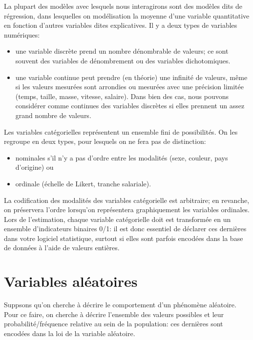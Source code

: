 \documentclass[
  11pt,
  letterpaper,
]{scrbook}
\providecommand{\tightlist}{%
  \setlength{\itemsep}{0pt}\setlength{\parskip}{0pt}}\usepackage{longtable,booktabs,array}
\theoremstyle{plain}
\theoremstyle{plain}
\theoremstyle{definition}
\theoremstyle{definition}
\theoremstyle{remark}
\begin{document}
La plupart des modèles avec lesquels nous interagirons sont des modèles
dits de régression, dans lesquelles on modélisation la moyenne d'une
variable quantitative en fonction d'autres variables dites explicatives.
Il y a deux types de variables numériques:

\begin{itemize}
\tightlist
\item
  une variable discrète prend un nombre dénombrable de valeurs; ce sont
  souvent des variables de dénombrement ou des variables dichotomiques.
\item
  une variable continue peut prendre (en théorie) une infinité de
  valeurs, même si les valeurs mesurées sont arrondies ou mesurées avec
  une précision limitée (temps, taille, masse, vitesse, salaire). Dans
  bien des cas, nous pouvons considérer comme continues des variables
  discrètes si elles prennent un assez grand nombre de valeurs.
\end{itemize}

Les variables catégorielles représentent un ensemble fini de
possibilités. On les regroupe en deux types, pour lesquels on ne fera
pas de distinction:

\begin{itemize}
\tightlist
\item
  nominales s'il n'y a pas d'ordre entre les modalités (sexe, couleur,
  pays d'origine) ou
\item
  ordinale (échelle de Likert, tranche salariale).
\end{itemize}

La codification des modalités des variables catégorielle est arbitraire;
en revanche, on préservera l'ordre lorsqu'on représentera graphiquement
les variables ordinales. Lors de l'estimation, chaque variable
catégorielle doit est transformée en un ensemble d'indicateurs binaires
0/1: il est donc essentiel de déclarer ces dernières dans votre logiciel
statistique, surtout si elles sont parfois encodées dans la base de
données à l'aide de valeurs entières.

\section{Variables aléatoires}\label{variable-aleatoire}

Suppsons qu'on cherche à décrire le comportement d'un phénomène
aléatoire. Pour ce faire, on cherche à décrire l'ensemble des valeurs
possibles et leur probabilité/fréquence relative au sein de la
population: ces dernières sont encodées dans la loi de la variable
aléatoire.
\end{document}
